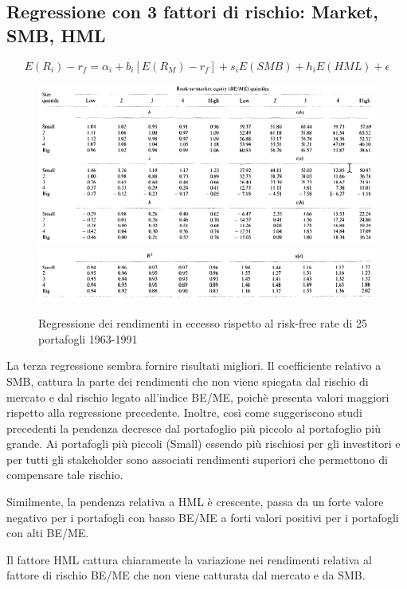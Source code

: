 \subsection{Regressione con 3 fattori di rischio: Market, SMB, HML}
\begin{equation}
E(R_i)-r_f= \alpha_i + b_i[E(R_M)-r_f]+s_iE(SMB)+ h_iE(HML)+\epsilon
\end{equation}
\begin{figure}[h]
	\centering
	\includegraphics[width=1\linewidth]{"imgs/Table 6"}
	\label{fig:table-6}
	\includegraphics[width=1\linewidth]{"imgs/table 6 2"}
	\caption{Regressione dei rendimenti in eccesso rispetto al risk-free rate di 25 portafogli 1963-1991}
	\label{fig:table-6-2}
\end{figure}
La terza regressione sembra fornire risultati migliori. Il coefficiente relativo a SMB, cattura la parte dei rendimenti che non viene spiegata dal rischio di mercato e dal rischio legato all'indice BE/ME, poichè presenta valori maggiori rispetto alla regressione precedente. Inoltre, così come suggeriscono studi precedenti la pendenza decresce dal portafoglio più piccolo al portafoglio più grande. Ai portafogli più piccoli (Small) essendo più rischiosi per gli investitori e per tutti gli stakeholder sono associati rendimenti superiori che permettono di compensare tale rischio. 

Similmente, la pendenza relativa a HML è crescente, passa da un forte valore negativo per i portafogli con basso BE/ME a forti valori positivi per i portafogli con alti BE/ME. 

Il fattore HML cattura chiaramente la variazione nei rendimenti relativa al fattore di rischio BE/ME che non viene catturata dal mercato e da SMB. 

